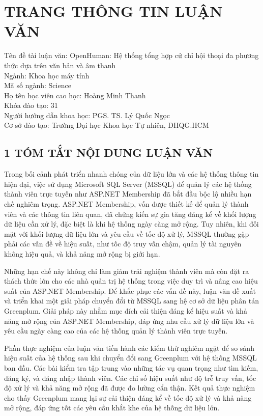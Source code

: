 \documentclass{article}[13pt]
\begin{document}
\pagebreak


{}
\section*{\centering \MakeUppercase{TRANG THÔNG TIN LUẬN VĂN}}


Tên đề tài luận văn: OpenHuman: Hệ thống tổng hợp cử chỉ hội thoại đa phương thức dựa trên văn bản và âm thanh \\
Ngành: Khoa học máy tính \\
Mã số ngành:  Science \\
Họ tên học viên cao học: Hoàng Minh Thanh \\
Khóa đào tạo: 31 \\
Người hướng dẫn khoa học: PGS. TS. Lý Quốc Ngọc \\
Cơ sở đào tạo: Trường Đại học Khoa học Tự nhiên, ĐHQG.HCM


\subsection*{1 TÓM TẮT NỘI DUNG LUẬN VĂN}
Trong bối cảnh phát triển nhanh chóng của dữ liệu lớn và các hệ thống thông tin hiện đại, việc sử dụng Microsoft SQL Server (MSSQL) để quản lý các hệ thống thành viên trực tuyến như ASP.NET Membership đã bắt đầu bộc lộ nhiều hạn chế nghiêm trọng. ASP.NET Membership, vốn được thiết kế để quản lý thành viên và các thông tin liên quan, đã chứng kiến sự gia tăng đáng kể về khối lượng dữ liệu cần xử lý, đặc biệt là khi hệ thống ngày càng mở rộng. Tuy nhiên, khi đối mặt với khối lượng dữ liệu lớn và yêu cầu về tốc độ xử lý, MSSQL thường gặp phải các vấn đề về hiệu suất, như tốc độ truy vấn chậm, quản lý tài nguyên không hiệu quả, và khả năng mở rộng bị giới hạn.

Những hạn chế này không chỉ làm giảm trải nghiệm thành viên mà còn đặt ra thách thức lớn cho các nhà quản trị hệ thống trong việc duy trì và nâng cao hiệu suất của ASP.NET Membership. Để khắc phục các vấn đề này, luận văn đề xuất và triển khai một giải pháp chuyển đổi từ MSSQL sang hệ cơ sở dữ liệu phân tán Greenplum. Giải pháp này nhằm mục đích cải thiện đáng kể hiệu suất và khả năng mở rộng của ASP.NET Membership, đáp ứng nhu cầu xử lý dữ liệu lớn và yêu cầu ngày càng cao của các hệ thống quản lý thành viên trực tuyến.


Phần thực nghiệm của luận văn tiến hành các kiểm thử nghiêm ngặt để so sánh hiệu suất của hệ thống sau khi chuyển đổi sang Greenplum với hệ thống MSSQL ban đầu. Các bài kiểm tra tập trung vào những tác vụ quan trọng như tìm kiếm, đăng ký, và đăng nhập thành viên. Các chỉ số hiệu suất như độ trễ truy vấn, tốc độ xử lý và khả năng mở rộng đã được đo lường cẩn thận. Kết quả thực nghiệm cho thấy Greenplum mang lại sự cải thiện đáng kể về tốc độ xử lý và khả năng mở rộng, đáp ứng tốt các yêu cầu khắt khe của hệ thống dữ liệu lớn.
\end{document}
